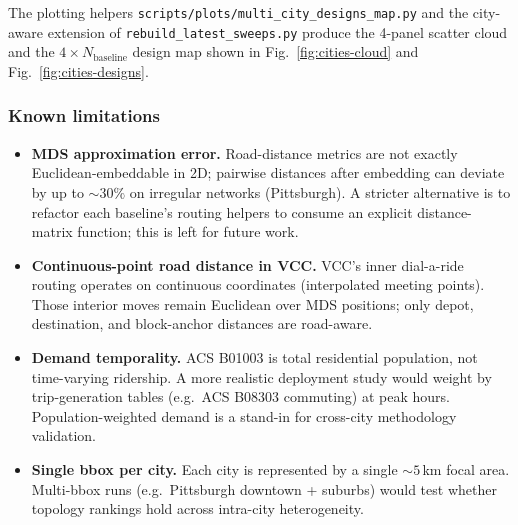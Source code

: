 The plotting helpers
\verb|scripts/plots/multi_city_designs_map.py| and the city-aware
extension of \verb|rebuild_latest_sweeps.py| produce the
4-panel scatter cloud and the $4 \times N_{\mathrm{baseline}}$
design map shown in Fig.~\ref{fig:cities-cloud} and
Fig.~\ref{fig:cities-designs}.

\subsubsection{Known limitations}

\begin{itemize}
  \item \textbf{MDS approximation error.} Road-distance metrics are
    not exactly Euclidean-embeddable in 2D; pairwise distances
    after embedding can deviate by up to $\sim 30\%$ on irregular
    networks (Pittsburgh). A stricter alternative is to refactor
    each baseline's routing helpers to consume an explicit
    distance-matrix function; this is left for future work.
  \item \textbf{Continuous-point road distance in VCC.} VCC's
    inner dial-a-ride routing operates on continuous coordinates
    (interpolated meeting points). Those interior moves remain
    Euclidean over MDS positions; only depot, destination, and
    block-anchor distances are road-aware.
  \item \textbf{Demand temporality.} ACS B01003 is total residential
    population, not time-varying ridership. A more realistic
    deployment study would weight by trip-generation tables
    (e.g.\ ACS B08303 commuting) at peak hours. Population-weighted
    demand is a stand-in for cross-city methodology validation.
  \item \textbf{Single bbox per city.} Each city is represented by
    a single $\sim 5\,$km focal area. Multi-bbox runs (e.g.\
    Pittsburgh downtown + suburbs) would test whether topology
    rankings hold across intra-city heterogeneity.
\end{itemize}

